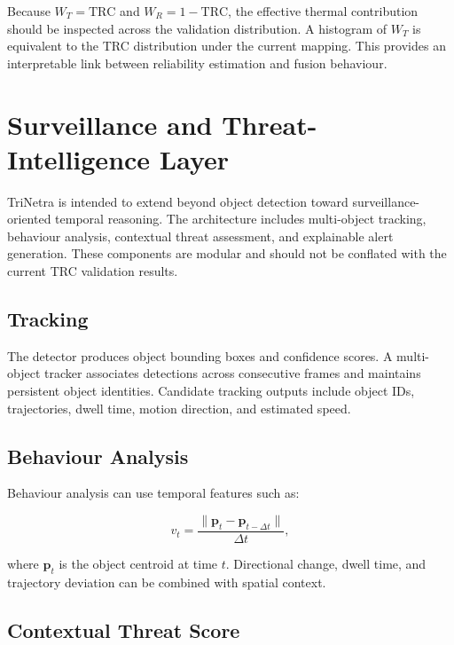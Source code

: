 \documentclass[conference]{IEEEtran}
\begin{document}
Because $W_T=\mathrm{TRC}$ and $W_R=1-\mathrm{TRC}$, the effective thermal contribution should be inspected across the validation distribution. A histogram of $W_T$ is equivalent to the TRC distribution under the current mapping. This provides an interpretable link between reliability estimation and fusion behaviour.


\section{Surveillance and Threat-Intelligence Layer}

TriNetra is intended to extend beyond object detection toward surveillance-oriented temporal reasoning. The architecture includes multi-object tracking, behaviour analysis, contextual threat assessment, and explainable alert generation. These components are modular and should not be conflated with the current TRC validation results.

\subsection{Tracking}

The detector produces object bounding boxes and confidence scores. A multi-object tracker associates detections across consecutive frames and maintains persistent object identities. Candidate tracking outputs include object IDs, trajectories, dwell time, motion direction, and estimated speed.

\subsection{Behaviour Analysis}

Behaviour analysis can use temporal features such as:

\begin{equation}
v_t=\frac{\|\mathbf{p}_t-\mathbf{p}_{t-\Delta t}\|}{\Delta t},
\end{equation}

where $\mathbf{p}_t$ is the object centroid at time $t$. Directional change, dwell time, and trajectory deviation can be combined with spatial context.

\subsection{Contextual Threat Score}
\end{document}
